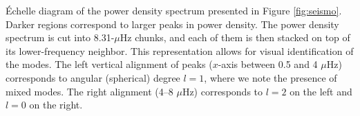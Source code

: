\label{fig:echelle} \'Echelle diagram of the power density spectrum presented in Figure \ref{fig:seismo}. Darker regions correspond to larger peaks in power density. The power density spectrum is cut into 8.31-$\mu$Hz chunks, and each of them is then stacked on top of its lower-frequency neighbor. This representation allows for visual identification of the modes. The left vertical alignment of peaks ($x$-axis between 0.5 and 4 $\mu$Hz) corresponds to angular (spherical) degree $l=1$, where we note the presence of mixed modes. The right alignment (4--8 $\mu$Hz) corresponds to $l=2$ on the left and $l=0$ on the right.

  
  
